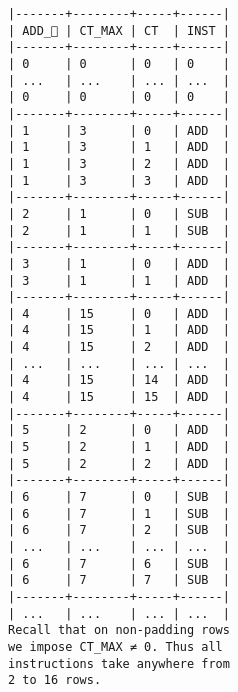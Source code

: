 \documentclass[varwidth=\maxdimen,margin=0.5cm,multi={verbatim}]{standalone}
\begin{document}
\begin{verbatim}
|-------+--------+-----+------|
| ADD_ | CT_MAX | CT  | INST |
|-------+--------+-----+------|
| 0     | 0      | 0   | 0    |
| ...   | ...    | ... | ...  |
| 0     | 0      | 0   | 0    |
|-------+--------+-----+------|
| 1     | 3      | 0   | ADD  |
| 1     | 3      | 1   | ADD  |
| 1     | 3      | 2   | ADD  |
| 1     | 3      | 3   | ADD  |
|-------+--------+-----+------|
| 2     | 1      | 0   | SUB  |
| 2     | 1      | 1   | SUB  |
|-------+--------+-----+------|
| 3     | 1      | 0   | ADD  |
| 3     | 1      | 1   | ADD  |
|-------+--------+-----+------|
| 4     | 15     | 0   | ADD  |
| 4     | 15     | 1   | ADD  |
| 4     | 15     | 2   | ADD  |
| ...   | ...    | ... | ...  |
| 4     | 15     | 14  | ADD  |
| 4     | 15     | 15  | ADD  |
|-------+--------+-----+------|
| 5     | 2      | 0   | ADD  |
| 5     | 2      | 1   | ADD  |
| 5     | 2      | 2   | ADD  |
|-------+--------+-----+------|
| 6     | 7      | 0   | SUB  |
| 6     | 7      | 1   | SUB  |
| 6     | 7      | 2   | SUB  |
| ...   | ...    | ... | ...  |
| 6     | 7      | 6   | SUB  |
| 6     | 7      | 7   | SUB  |
|-------+--------+-----+------|
| ...   | ...    | ... | ...  |
Recall that on non-padding rows
we impose CT_MAX ≠ 0. Thus all
instructions take anywhere from
2 to 16 rows.
\end{verbatim}
\end{document}
